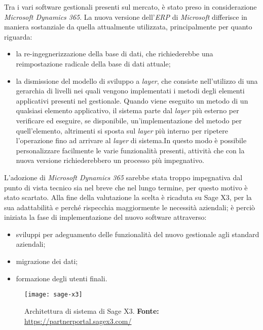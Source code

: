 Tra i vari software gestionali presenti sul mercato, è stato preso in considerazione \textit{Microsoft Dynamics 365}. La nuova versione dell'\textit{ERP} di \textit{Microsoft} differisce in maniera sostanziale da quella attualmente utilizzata, principalmente per quanto riguarda:
\begin{itemize}
	\item la re-ingegnerizzazione della base di dati, che richiederebbe una reimpostazione radicale della base di dati attuale;
	\item la dismissione del modello di sviluppo a \textit{layer}, che consiste nell'utilizzo di una gerarchia di livelli nei quali vengono implementati i metodi degli elementi applicativi presenti nel gestionale. Quando viene eseguito un metodo di un qualsiasi elemento applicativo, il sistema parte dal \textit{layer} più esterno per verificare ed eseguire, se disponibile, un'implementazione del metodo per quell'elemento, altrimenti si sposta sul \textit{layer} più interno per ripetere l'operazione fino ad arrivare al \textit{layer} di sistema.In questo modo è possibile personalizzare facilmente le varie funzionalità presenti, attività che con la nuova versione richiederebbero un processo più impegnativo.
\end{itemize}
L'adozione di \textit{Microsoft Dynamics 365} sarebbe stata troppo impegnativa dal punto di vista tecnico sia nel breve che nel lungo termine, per questo motivo è stato scartato.
Alla fine della valutazione la scelta è ricaduta su Sage X3, per la sua adattabilità e perché rispecchia maggiormente le necessità aziendali; è perciò iniziata la fase di implementazione del nuovo software attraverso:

\begin{itemize}
	\item sviluppi per adeguamento delle funzionalità del nuovo gestionale agli standard aziendali;
	\item migrazione dei dati;
	\item formazione degli utenti finali.
\end{itemize}


\vspace{10pt}
\begin{figure}[htbp]
	\begin{center}
		\texttt{[image: sage-x3]}
		\caption{Architettura di sistema di Sage X3. \newline \textbf{Fonte: }\url{https://partnerportal.sagex3.com/}}
	\end{center}
\end{figure}
\vspace{30pt}


